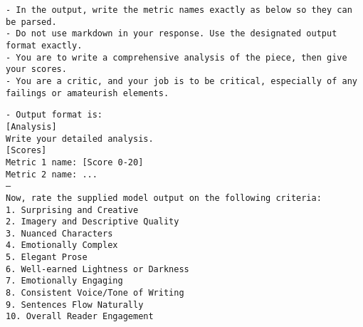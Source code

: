 \begin{tcolorbox}[colback=blue!5!white, colframe=blue!75!black, title=Creative Writing Evaluation Rubric (Part 1):]
\texttt{- In the output, write the metric names exactly as below so they can be parsed.}\\

\texttt{- Do not use markdown in your response. Use the designated output format exactly.}\\

\texttt{- You are to write a comprehensive analysis of the piece, then give your scores.}\\

\texttt{- You are a critic, and your job is to be critical, especially of any failings or amateurish elements.}\\
\end{tcolorbox}

\begin{tcolorbox}[colback=blue!5!white, colframe=blue!75!black, title=Creative Writing Evaluation Rubric (Part 2):]
\small
\texttt{- Output format is:}\\

\texttt{[Analysis]}\\

\texttt{Write your detailed analysis.}\\

\texttt{[Scores]}\\

\texttt{Metric 1 name: [Score 0-20]}\\

\texttt{Metric 2 name: ...}\\

\texttt{---}\\

\texttt{Now, rate the supplied model output on the following criteria:}\\

\texttt{1. Surprising and Creative}\\
\texttt{2. Imagery and Descriptive Quality}\\
\texttt{3. Nuanced Characters}\\
\texttt{4. Emotionally Complex}\\
\texttt{5. Elegant Prose}\\
\texttt{6. Well-earned Lightness or Darkness}\\
\texttt{7. Emotionally Engaging}\\
\texttt{8. Consistent Voice/Tone of Writing}\\
\texttt{9. Sentences Flow Naturally}\\
\texttt{10. Overall Reader Engagement}
\end{tcolorbox}

